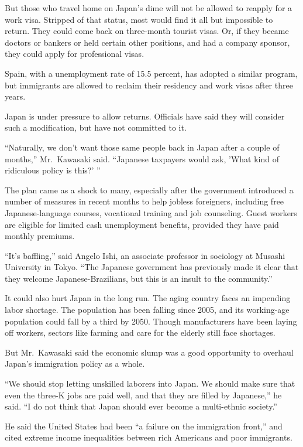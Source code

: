 \documentclass[12pt,a4paper,onecolumn]{article}
\begin{document}
But those who travel home on Japan's dime will not be allowed to reapply for a work visa. Stripped
of that status, most would find it all but impossible to return. They could come back on three-month
tourist visas. Or, if they became doctors or bankers or held certain other positions, and had a
company sponsor, they could apply for professional visas.

Spain, with a unemployment rate of 15.5 percent, has adopted a similar program, but immigrants are
allowed to reclaim their residency and work visas after three years.

Japan is under pressure to allow returns. Officials have said they will consider such a
modification, but have not committed to it.

``Naturally, we don't want those same people back in Japan after a couple of months,'' Mr.~Kawasaki
said. ``Japanese taxpayers would ask, 'What kind of ridiculous policy is this?' ''

The plan came as a shock to many, especially after the government introduced a number of measures in
recent months to help jobless foreigners, including free Japanese-language courses, vocational
training and job counseling. Guest workers are eligible for limited cash unemployment benefits,
provided they have paid monthly premiums.

``It's baffling,'' said Angelo Ishi, an associate professor in sociology at Musashi University in
Tokyo. ``The Japanese government has previously made it clear that they welcome Japanese-Brazilians,
but this is an insult to the community.''

It could also hurt Japan in the long run. The aging country faces an impending labor shortage. The
population has been falling since 2005, and its working-age population could fall by a third by
2050. Though manufacturers have been laying off workers, sectors like farming and care for the
elderly still face shortages.

But Mr.~Kawasaki said the economic slump was a good opportunity to overhaul Japan's immigration
policy as a whole.

``We should stop letting unskilled laborers into Japan. We should make sure that even the three-K
jobs are paid well, and that they are filled by Japanese,'' he said. ``I do not think that Japan
should ever become a multi-ethnic society.''

He said the United States had been ``a failure on the immigration front,'' and cited extreme income
inequalities between rich Americans and poor immigrants.
\end{document}
